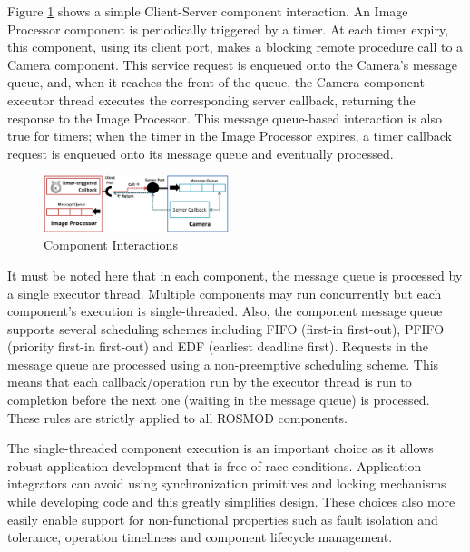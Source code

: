 \vspace{-0.1in}

Figure \ref{fig:Component_Message_Queue} shows a simple Client-Server component interaction. An Image Processor component is periodically triggered by a timer. At each timer expiry, this component, using its client port, makes a blocking remote procedure call to a Camera component. This service request is enqueued onto the Camera's message queue, and, when it reaches the front of the queue, the Camera component executor thread executes the corresponding server callback, returning the response to the Image Processor. This message queue-based interaction is also true for timers; when the timer in the Image Processor expires, a timer callback request is enqueued onto its message queue and eventually processed. 

\begin{figure}[h]
	\centering
	\includegraphics[width=0.48\textwidth]{figs/Component_Message_Queue.png}
	\caption{Component Interactions}
	\label{fig:Component_Message_Queue}
\end{figure}

It must be noted here that in each component, the message queue is processed by a single executor thread. Multiple components may run concurrently but each component's execution is single-threaded. Also, the component message queue supports several scheduling schemes including FIFO (first-in first-out), PFIFO (priority first-in first-out) and EDF (earliest deadline first). Requests in the message queue are processed using a non-preemptive scheduling scheme. This means that each callback/operation run by the executor thread is run to completion before the next one (waiting in the message queue) is processed. These rules are strictly applied to all ROSMOD components.

The single-threaded component execution is an important choice as it allows robust application development that is free of race conditions. Application integrators can avoid using synchronization primitives and locking mechanisms while developing code and this greatly simplifies design. These choices also more easily enable support for non-functional properties such as fault isolation and tolerance, operation timeliness and component lifecycle management. 

